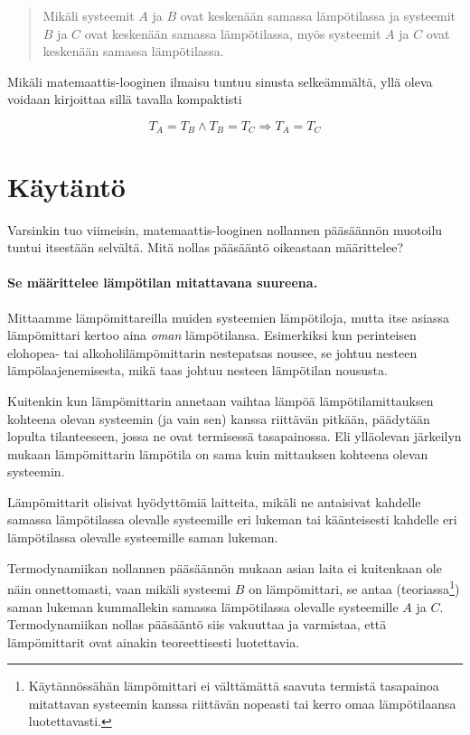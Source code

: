 \documentclass[12pt,a4paper,finnish]{book}
\begin{document}
\begin{quote}
 Mikäli systeemit $A$ ja $B$ ovat keskenään samassa lämpötilassa ja systeemit $B$ ja $C$ ovat 
 keskenään samassa lämpötilassa, myös systeemit $A$ ja $C$ ovat keskenään samassa lämpötilassa.
\end{quote}

Mikäli matemaattis-looginen ilmaisu tuntuu sinusta selkeämmältä, yllä oleva voidaan kirjoittaa 
sillä tavalla kompaktisti 

\begin{equation}
 T_A = T_B \wedge T_B = T_C \Rightarrow T_A = T_C
\end{equation}

\section{Käytäntö} %

Varsinkin tuo viimeisin, matemaattis-looginen nollannen pääsäännön muotoilu tuntui itsestään 
selvältä. Mitä nollas pääsääntö oikeastaan määrittelee?

\paragraph{Se määrittelee lämpötilan mitattavana suureena.}

Mittaamme lämpömittareilla muiden systeemien lämpötiloja, mutta itse asiassa lämpömittari kertoo aina 
\textit{oman} lämpötilansa. Esimerkiksi kun perinteisen elohopea- tai alkoholilämpömittarin nestepatsas 
nousee, se johtuu nesteen lämpölaajenemisesta, mikä taas johtuu nesteen lämpötilan noususta.

Kuitenkin kun lämpömittarin annetaan vaihtaa lämpöä lämpötilamittauksen kohteena olevan systeemin (ja 
vain sen) kanssa riittävän pitkään, päädytään lopulta tilanteeseen, jossa ne ovat termisessä tasapainossa. 
Eli ylläolevan järkeilyn mukaan lämpömittarin lämpötila on sama kuin mittauksen kohteena olevan systeemin.

Lämpömittarit olisivat hyödyttömiä laitteita, mikäli ne antaisivat kahdelle samassa lämpötilassa olevalle 
systeemille eri lukeman tai käänteisesti kahdelle eri lämpötilassa olevalle systeemille saman lukeman. 

Termodynamiikan nollannen pääsäännön mukaan asian laita ei kuitenkaan ole näin onnettomasti, vaan mikäli 
systeemi $B$ on lämpömittari, se antaa (teoriassa\footnote{Käytännössähän lämpömittari ei välttämättä 
saavuta termistä tasapainoa mitattavan systeemin kanssa riittävän nopeasti tai kerro omaa lämpötilaansa 
luotettavasti.}) saman lukeman kummallekin samassa lämpötilassa olevalle systeemille $A$ ja $C$. 
Termodynamiikan nollas pääsääntö siis vakuuttaa ja varmistaa, että lämpömittarit ovat ainakin teoreettisesti 
luotettavia. 
\end{document}
